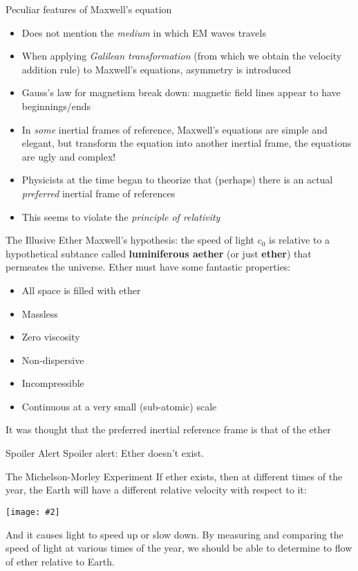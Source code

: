 \documentclass[12pt,compress,aspectratio=169]{beamer}
\newcommand{\pic}[2]{\texttt{[image: \#2]}}
\begin{document}
\begin{frame}{Peculiar features of Maxwell's equation}
  \begin{itemize}
  \item Does not mention the \emph{medium} in which EM waves travels
  \item When applying \emph{Galilean transformation} (from which we obtain
    the velocity addition rule) to Maxwell's equations, asymmetry is introduced
  \item Gauss's law for magnetism break down: magnetic field lines appear to
    have beginnings/ends
  \item In \emph{some} inertial frames of reference, Maxwell's equations are
    simple and elegant, but transform the equation into another inertial frame,
    the equations are ugly and complex!
  \item Physicists at the time began to theorize that (perhaps) there is an
    actual \emph{preferred} inertial frame of references
  \item This seems to violate the \emph{principle of relativity}
  \end{itemize}
\end{frame}



\begin{frame}{The Illusive Ether}
  Maxwell's hypothesis: the speed of light $c_0$ is relative to a hypothetical
  subtance called \textbf{luminiferous aether} (or just \textbf{ether}) that
  permeates the universe. Ether must have some fantastic properties:
  \begin{itemize}
  \item All space is filled with ether
  \item Massless
  \item Zero viscosity
  \item Non-dispersive
  \item Incompressible
  \item Continuous at a very small (sub-atomic) scale
  \end{itemize}
  It was thought that the preferred inertial reference frame is that of the
  ether
\end{frame}



\begin{frame}{Spoiler Alert}
  Spoiler alert: Ether doesn't exist.
\end{frame}



\begin{frame}{The Michelson-Morley Experiment}
  If ether exists, then at different times of the year, the Earth will have a
  different relative velocity with respect to it:
  \begin{center}
    \pic{.35}{graphics/2000px-AetherWind.png}
  \end{center}
  And it causes light to speed up or slow down. By measuring and comparing the
  speed of light at various times of the year, we should be able to determine
  to flow of ether relative to Earth.
\end{frame}
\end{document}
